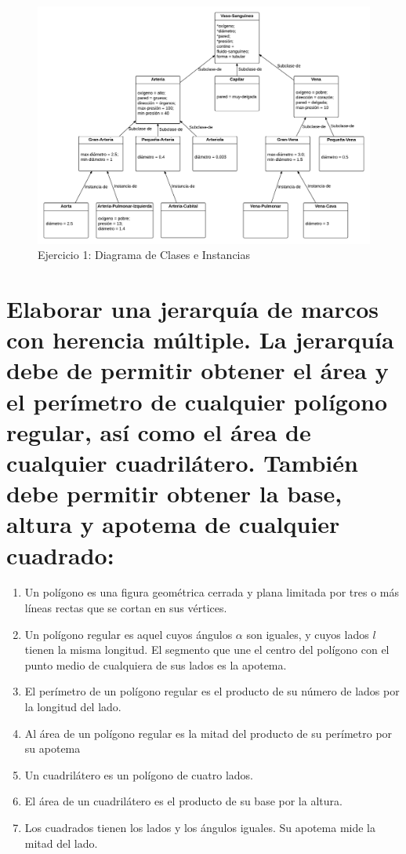 \documentclass[10pt, a4paper,spanish]{article}
\begin{document}
			\begin{figure}[H]
				\begin{center}
					\includegraphics[width=\textwidth]{exercise-1-diagram}
					\caption{Ejercicio 1: Diagrama de Clases e Instancias}
					\label{image:diagram-1}
				\end{center}
			\end{figure}


	\section{Elaborar una jerarquía de marcos con herencia múltiple. La jerarquía debe de permitir obtener el área y el perímetro de cualquier polígono regular, así como el área de cualquier cuadrilátero. También debe permitir obtener la base, altura y apotema de cualquier cuadrado:}

		\begin{enumerate}[label=\alph*)]

			\item Un polígono es una figura geométrica cerrada y plana limitada por tres o más líneas rectas que se cortan en sus vértices.

			\item Un polígono regular es aquel cuyos ángulos $\alpha$ son iguales, y cuyos lados $l$ tienen la misma longitud. El segmento que une el centro del polígono con el punto medio de cualquiera de sus lados es la apotema.

			\item El perímetro de un polígono regular es el producto de su número de lados por la longitud del lado.

			\item Al área de un polígono regular es la mitad del producto de su perímetro por su apotema

			\item Un cuadrilátero es un polígono de cuatro lados.

			\item El área de un cuadrilátero es el producto de su base por la altura.

			\item Los cuadrados tienen los lados y los ángulos iguales. Su apotema mide la mitad del lado.

		\end{enumerate}
\end{document}
